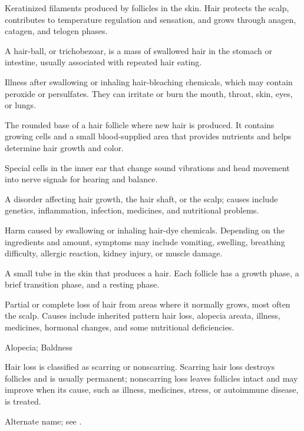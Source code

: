 Keratinized filaments produced by follicles in the skin. Hair protects the scalp, contributes to temperature regulation and sensation, and grows through anagen, catagen, and telogen phases.

 A hair-ball, or trichobezoar, is a mass of swallowed hair in the stomach or intestine, usually associated with repeated hair eating.

 Illness after swallowing or inhaling hair-bleaching chemicals, which may contain peroxide or persulfates. They can irritate or burn the mouth, throat, skin, eyes, or lungs.

 The rounded base of a hair follicle where new hair is produced. It contains growing cells and a small blood-supplied area that provides nutrients and helps determine hair growth and color.

 Special cells in the inner ear that change sound vibrations and head movement into nerve signals for hearing and balance.

 A disorder affecting hair growth, the hair shaft, or the scalp; causes include genetics, inflammation, infection, medicines, and nutritional problems.

 Harm caused by swallowing or inhaling hair-dye chemicals. Depending on the ingredients and amount, symptoms may include vomiting, swelling, breathing difficulty, allergic reaction, kidney injury, or muscle damage.

 A small tube in the skin that produces a hair. Each follicle has a growth phase, a brief transition phase, and a resting phase.

 Partial or complete loss of hair from areas where it normally grows, most often the scalp. Causes include inherited pattern hair loss, alopecia areata, illness, medicines, hormonal changes, and some nutritional deficiencies.

\synonyms
Alopecia; Baldness

 Hair loss is classified as scarring or nonscarring. Scarring hair loss destroys follicles and is usually permanent; nonscarring loss leaves follicles intact and may improve when its cause, such as illness, medicines, stress, or autoimmune disease, is treated.

 Alternate name; see .

